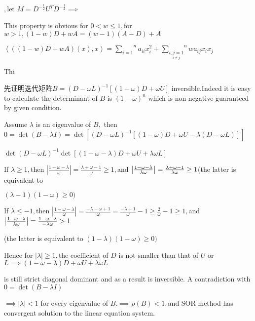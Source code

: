 \documentclass{article}
\begin{document}
$,$let $M=D^{-\frac{1}{2}}U^{T}D^{-\frac{1}{2}}\implies $

This property is obvious for $0<w\leq 1,$for $w>1,\left( 1-w\right)
D+wA=\left( w-1\right) \left( A-D\right) +A$

$\left\langle \left( \left( 1-w\right) D+wA\right) \left( x\right)
,x\right\rangle =\overset{n}{\underset{i=1}{\sum }}a_{ii}x_{i}^{2}+\overset{n%
}{\underset{\underset{i\neq j}{i,j=1}}{\sum }}wa_{ij}x_{i}x_{j}$

Thi


先证明迭代矩阵$B=\left( D-\omega
L\right) ^{-1}\left[ \left( 1-\omega \right) D+\omega U\right] $
inversible.Indeed it is easy to calculate the determinant of $B$ is $\left(
1-\omega \right) ^{n}$ which is non-negative guaranteed by given condition.

Assume $\lambda $ is an eigenvalue of $B,$ then $0=\det \left( B-\lambda
I\right) =\det \left[ \left( D-\omega L\right) ^{-1}\left[ \left( 1-\omega
\right) D+\omega U-\lambda \left( D-\omega L\right) \right] \right] $

$\det \left( D-\omega L\right) ^{-1}\det [\left( 1-\omega -\lambda \right)
D+\omega U+\lambda \omega L]$

If $\lambda \geq 1,$then $\left\vert \frac{1-\omega -\lambda }{\omega }%
\right\vert =\frac{\lambda +\omega -1}{\omega }\geq 1,$and $\left\vert \frac{%
1-\omega -\lambda }{\lambda \omega }\right\vert =\frac{\lambda +\omega -1}{%
\lambda \omega }\geq 1$(the latter is equivalent to

$\left( \lambda -1\right) \left( 1-\omega \right) \geq 0)$

If $\lambda \leq -1,$then $\left\vert \frac{1-\omega -\lambda }{\omega }%
\right\vert =\frac{-\lambda -\omega +1}{\omega }=\frac{-\lambda +1}{\omega }%
-1\geq \frac{2}{\omega }-1\geq 1,$and $\left\vert \frac{1-\omega -\lambda }{%
\lambda \omega }\right\vert =\frac{1-\omega -\lambda }{-\lambda \omega }>1$

(the latter is equivalent to $\left( 1-\lambda \right) \left( 1-\omega
\right) \geq 0)$

Hence for $\left\vert \lambda \right\vert \geq 1,$the coefficient of $D$ is
not smaller than that of $U$ or $L\implies \left( 1-\omega -\lambda \right)
D+\omega U+\lambda \omega L$

is still strict diagonal dominant and as a result is inversible. A
contradiction with $0=\det \left( B-\lambda I\right) $

$\implies \left\vert \lambda \right\vert <1$ for every eigenvalue of $%
B.\implies \rho \left( B\right) <1,$and SOR method has convergent solution
to the linear equation system.
\end{document}
